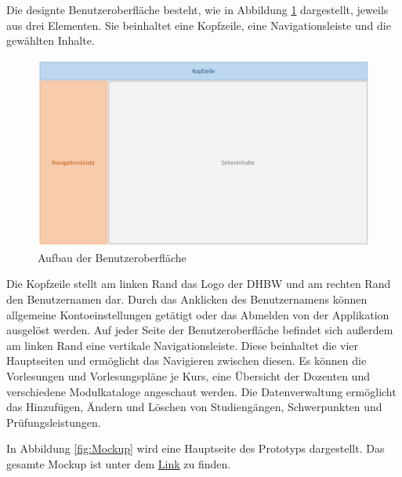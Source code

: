 Die designte Benutzeroberfläche besteht, wie in Abbildung \ref{fig:Seitenaufbau} dargestellt, jeweils aus drei Elementen.
Sie beinhaltet eine Kopfzeile, eine Navigationsleiste und die gewählten Inhalte.
\begin{figure}[h]
	\centering 
	\includegraphics[width=\textwidth]{img/Seitenaufbau.pdf}
	\captionsetup{format=hang}
	\caption[Aufbau der Benutzeroberfläche]{\label{fig:Seitenaufbau}Aufbau der Benutzeroberfläche}
\end{figure}
Die Kopfzeile stellt am linken Rand das Logo der \acs{DHBW} und am rechten Rand den Benutzernamen dar.
Durch das Anklicken des Benutzernamens können allgemeine Kontoeinstellungen getätigt oder das Abmelden von der Applikation ausgelöst werden.
Auf jeder Seite der Benutzeroberfläche befindet sich außerdem am linken Rand eine vertikale Navigationsleiste.
Diese beinhaltet die vier Hauptseiten und ermöglicht das Navigieren zwischen diesen.
Es können die Vorlesungen und Vorlesungspläne je Kurs, eine Übersicht der Dozenten und verschiedene Modulkataloge angeschaut werden. Die Datenverwaltung ermöglicht das Hinzufügen, Ändern und Löschen von Studiengängen, Schwerpunkten und Prüfungsleistungen.

In Abbildung \ref{fig:Mockup} wird eine Hauptseite des Prototyps dargestellt. Das gesamte Mockup ist unter dem \underline{\hyperlink{https://www.figma.com/proto/WZp01tmSA4nxDskhnfqv3x/Fourth-Prototype?node-id=1\%3A2\&scaling=contain}{Link}} zu finden.

